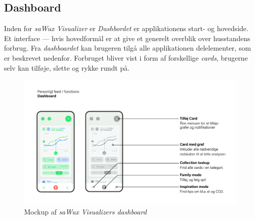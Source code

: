 \subsection{Dashboard}
Inden for \emph{saWux Visualizer} er \emph{Dashbordet} er applikationens start- og hovedside. Et interface — hvis hovedformål er at give et generelt overblik over husstandens forbrug. Fra \emph{dashboardet} kan brugeren tilgå alle applikationen delelementer, som er beskrevet nedenfor. Forbruget bliver vist i form af forskellige \emph{cards}, brugerne selv kan tilføje, slette og rykke rundt på. 
\begin{figure}[H]
    \centering
    \includegraphics[width=\textwidth]{Images/Main Board.png}
    \caption[\emph{Dashboard} mockup]{Mockup af \emph{saWux Visualizers dashboard}}
    \label{img:teknisk:dashboard}
\end{figure}

